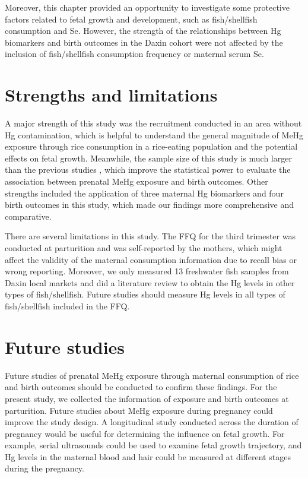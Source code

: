 Moreover, this chapter provided an opportunity to investigate some protective factors related to fetal growth and development, such as fish/shellfish consumption and Se. However, the strength of the relationships between Hg biomarkers and birth outcomes in the Daxin cohort were not affected by the inclusion of fish/shellfish consumption frequency or maternal serum Se.

\section{Strengths and limitations}

A major strength of this study was the recruitment conducted in an area without Hg contamination, which is helpful to understand the general magnitude of MeHg exposure through rice consumption in a rice-eating population and the potential effects on fetal growth. Meanwhile, the sample size of this study is much larger than the previous studies \citep{maramba2006environmental,rothenberg2013prenatal}, which improve the statistical power to evaluate the association between prenatal MeHg exposure and birth outcomes. Other strengths included the application of three maternal Hg biomarkers and four birth outcomes in this study, which made our findings more comprehensive and comparative.

There are several limitations in this study. The FFQ for the third trimester was conducted at parturition and was self-reported by the mothers, which might affect the validity of the maternal consumption information due to recall bias or wrong reporting. Moreover, we only measured 13 freshwater fish samples from Daxin local markets and did a literature review to obtain the Hg levels in other types of fish/shellfish. Future studies should measure Hg levels in all types of fish/shellfish included in the FFQ.

\section{Future studies}

Future studies of prenatal MeHg exposure through maternal consumption of rice and birth outcomes should be conducted to confirm these findings. For the present study, we collected the information of exposure and birth outcomes at parturition. Future studies about MeHg exposure during pregnancy could improve the study design. A longitudinal study conducted across the duration of pregnancy would be useful for determining the influence on fetal growth. For example, serial ultrasounds could be used to examine fetal
growth trajectory, and Hg levels in the maternal blood and hair could be measured at different stages during the pregnancy.

